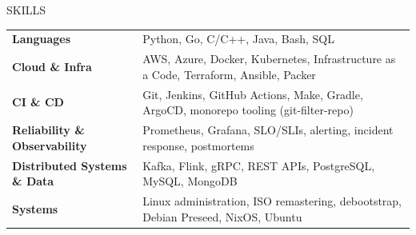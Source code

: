 \documentclass{resume} %
\begin{document}
\begin{rSection}{SKILLS}

\begin{tabular}{ @{} >{\bfseries}l @{\hspace{6ex}} l }

Languages & Python, Go, C/C++, Java, Bash, SQL\\
Cloud \& Infra & AWS, Azure, Docker, Kubernetes, Infrastructure as a Code, Terraform, Ansible, Packer\\
CI \& CD &  Git, Jenkins, GitHub Actions, Make, Gradle, ArgoCD, monorepo tooling (git-filter-repo)\\
Reliability \& Observability & Prometheus, Grafana, SLO/SLIs, alerting, incident response, postmortems\\
Distributed Systems \& Data & Kafka, Flink, gRPC, REST APIs, PostgreSQL, MySQL, MongoDB\\
Systems & Linux administration, ISO remastering, debootstrap, Debian Preseed, NixOS, Ubuntu

\end{tabular}
\end{rSection}
\end{document}
